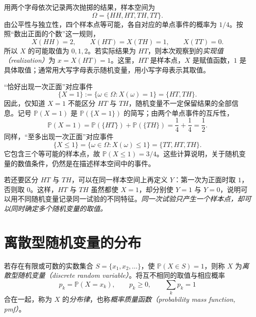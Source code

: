 \begin{solve}
用两个字母依次记录两次抛掷的结果，样本空间为
\[
  \Omega=\{HH,HT,TH,TT\}.
\]
由公平性与独立性，四个样本点等可能，各自对应的单点事件的概率为 $1/4$。按照“数出正面的个数”这一规则，
\begin{equation}
  X(HH)=2,\qquad X(HT)=X(TH)=1,\qquad X(TT)=0.
  \label{eq:study-random-variable-coin-map}
\end{equation}
所以 $X$ 的可能取值为 $0,1,2$。若实际结果为 $HT$，则本次观察到的\emph{实现值（realization）}为 $x=X(HT)=1$。这里，$HT$ 是样本点，$X$ 是赋值函数，$1$ 是具体取值；通常用大写字母表示随机变量，用小写字母表示其取值。

“恰好出现一次正面”对应事件
\begin{equation}
  \{X=1\}:=\{\omega\in\Omega:X(\omega)=1\}
    =\{HT,TH\}.
  \label{eq:study-random-variable-coin-event}
\end{equation}
因此，仅知道 $X=1$ 不能区分 $HT$ 与 $TH$，随机变量不一定保留结果的全部信息。记号 $\mathbb P(X=1)$ 是 $\mathbb P(\{X=1\})$ 的简写；由两个单点事件的互斥性，
\[
  \mathbb P(X=1)=\mathbb P(\{HT\})+\mathbb P(\{TH\})
    =\frac14+\frac14=\frac12.
\]
同样，“至多出现一次正面”对应事件
\[
  \{X\le1\}=\{\omega\in\Omega:X(\omega)\le1\}
    =\{TT,HT,TH\}.
\]
它包含三个等可能的样本点，故 $\mathbb P(X\le1)=3/4$。这些计算说明，关于随机变量的数值条件，仍然是在描述样本空间中的事件。

若还要区分 $HT$ 与 $TH$，可以在同一样本空间上再定义 $Y$：第一次为正面时取 $1$，否则取 $0$。这样，$HT$ 与 $TH$ 虽然都使 $X=1$，却分别使 $Y=1$ 与 $Y=0$，说明可以用不同随机变量记录同一试验的不同特征。\emph{同一次试验只产生一个样本点，却可以同时确定多个随机变量的取值。}
\end{solve}

\section{离散型随机变量的分布}
\label{sec:study-discrete-distributions}

\begin{definition}
\label{def:study-discrete-mass}
若存在有限或可数的实数集合 $S=\{x_1,x_2,\ldots\}$，使 $\mathbb P(X\in S)=1$，则称 $X$ 为\emph{离散型随机变量（discrete random variable）}。将互不相同的取值与相应概率
\begin{equation}
  p_k=\mathbb P(X=x_k),\qquad p_k\ge0,\qquad \sum_kp_k=1
  \label{eq:study-discrete-mass-conditions}
\end{equation}
合在一起，称为 $X$ 的\emph{分布律}，也称\emph{概率质量函数（probability mass function, pmf）}。
\end{definition}

